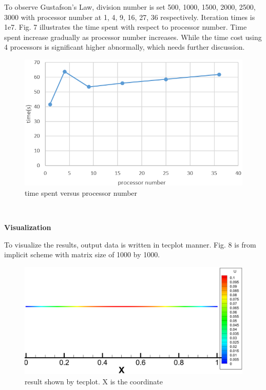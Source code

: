\documentclass[a4paper,10pt]{article}
\begin{document}
To observe Gustafson's Law, division number is set 500, 1000, 1500, 2000, 2500, 3000 with processor number at 1, 4, 9, 16, 27, 36 respectively. Iteration times is 1e7. Fig. 7 illustrates the time spent with respect to processor number. Time spent increase gradually as processor number increases. While the time cost using 4 processors is significant higher abnormally, which needs further discussion. 
\begin{figure}[h]
	\centering
	\includegraphics[scale=0.6]{Gustafson.png}
	\caption{time spent versus processor number}
\end{figure} \\
\clearpage

\large \textbf {Visualization}

To visualize the results, output data is written in tecplot manner. Fig. 8 is from implicit scheme with matrix size of 1000 by 1000. 
\begin{figure}[h]
	\centering
	\includegraphics[scale=0.2]{result_in_tecplot.png}
	\caption{result shown by tecplot. X is the coordinate}
\end{figure} \\
\end{document}
